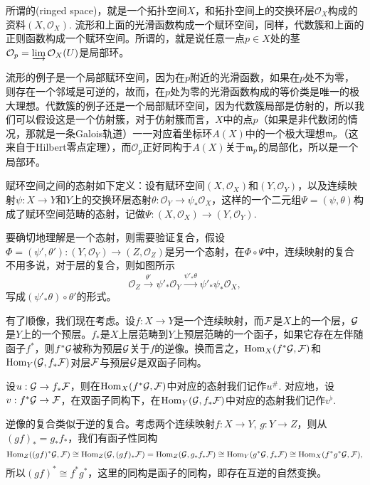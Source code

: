 \begin{para}[赋环空间]
所谓的(ringed space)，就是一个拓扑空间$X$，和拓扑空间上的交换环层$\mathcal{O}_X$构成的资料$(X,\mathcal{O}_X)$. 流形和上面的光滑函数构成一个赋环空间，同样，代数簇和上面的正则函数构成一个赋环空间。所谓的，就是说任意一点$p\in X$处的茎$\mathcal{O}_p=\varinjlim \mathcal{O}_X(U)$是局部环。
\end{para}

流形的例子是一个局部赋环空间，因为在$p$附近的光滑函数，如果在$p$处不为零，则存在一个邻域是可逆的，故而，在$p$处为零的光滑函数构成的等价类是唯一的极大理想。代数簇的例子还是一个局部赋环空间，因为代数簇局部是仿射的，所以我们可以假设这是一个仿射簇，对于仿射簇而言，$X$中的点$p$（如果是非代数闭的情况，那就是一条Galois轨道）一一对应着坐标环$A(X)$中的一个极大理想$\mathfrak{m}_p$（这来自于Hilbert零点定理），而$\mathcal{O}_p$正好同构于$A(X)$关于$\mathfrak{m}_p$的局部化，所以是一个局部环。

\begin{para}[赋环空间之间的态射]
赋环空间之间的态射如下定义：设有赋环空间$(X,\mathcal{O}_X)$和$(Y,\mathcal{O}_Y)$，以及连续映射$\psi:X\to Y$和$Y$上的交换环层态射$\theta:\mathcal{O}_Y\to \psi_*\mathcal{O}_X$，这样的一个二元组$\Psi=(\psi,\theta)$构成了赋环空间范畴的态射，记做$\Psi:(X,\mathcal{O}_X)\to (Y,\mathcal{O}_Y)$.
\end{para}

要确切地理解是一个态射，则需要验证复合，假设$\Phi=(\psi',\theta'):(Y,\mathcal{O}_Y)\to (Z,\mathcal{O}_Z)$是另一个态射，在$\Phi\circ \Psi$中，连续映射的复合不用多说，对于层的复合，则如图所示
\[
	\mathcal{O}_Z\xrightarrow{\theta'} \psi'_*\mathcal{O}_Y \xrightarrow{\psi'_*\theta} \psi'_*\psi_*\mathcal{O}_X,
\]
写成$(\psi'_*\theta)\circ \theta'$的形式。

\begin{para}[逆像]
有了顺像，我们现在考虑。设$f:X\to Y$是一个连续映射，而$\mathcal{F}$是$X$上的一个层，$\mathcal{G}$是$Y$上的一个预层。$f_*$是$X$上层范畴到$Y$上预层范畴的一个函子，如果它存在左伴随函子$f^*$，则$f^*\mathcal{G}$被称为预层$\mathcal{G}$关于$f$的逆像。换而言之，$\operatorname{Hom}_X(f^*\mathcal{G},\mathcal{F})$和$\operatorname{Hom}_Y(\mathcal{G},f_*\mathcal{F})$对层$\mathcal{F}$与预层$\mathcal{G}$是双函子同构。

设$u:\mathcal{G}\to f_*\mathcal{F}$，则在$\operatorname{Hom}_X(f^*\mathcal{G},\mathcal{F})$中对应的态射我们记作$u^\#$. 对应地，设$v:f^*\mathcal{G}\to \mathcal{F}$，在双函子同构下，在$\operatorname{Hom}_Y(\mathcal{G},f_*\mathcal{F})$中对应的态射我们记作$v^\flat$. 

逆像的复合类似于逆的复合。考虑两个连续映射$f:X\to Y$, $g:Y\to Z$，则从$(gf)_*=g_*f_*$，我们有函子性同构
\[
	\operatorname{Hom}_Z((gf)^*\mathcal{G},\mathcal{F})\cong \operatorname{Hom}_Z(\mathcal{G},(gf)_*\mathcal{F})=\operatorname{Hom}_Z(\mathcal{G},g_*f_*\mathcal{F})\cong \operatorname{Hom}_Y(g^*\mathcal{G},f_*\mathcal{F})\cong \operatorname{Hom}_X(f^*g^*\mathcal{G},\mathcal{F}),
\]
所以$(gf)^*\cong f^*g^*$，这里的同构是函子的同构，即存在互逆的自然变换。
\end{para}


